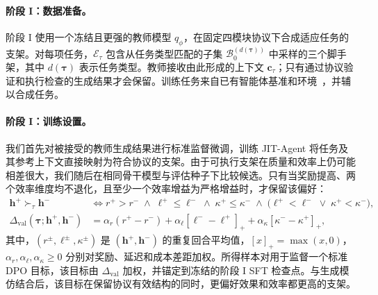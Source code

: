 \documentclass{article}
\newcommand{\ourmethod}{JIT-Agent\xspace}
\begin{document}
\vspace{-0.5em}
\paragraph{阶段 I：数据准备。}\label{sec:scaffold_synthesis}
阶段 I 使用一个冻结且更强的教师模型 $q_{\phi}$，在固定四模块协议下合成适应任务的支架。对每项任务，$\mathcal{E}_{\tau}$ 包含从任务类型匹配的子集 $\mathcal{B}_0^{(d(\boldsymbol{\tau}))}$ 中采样的三个脚手架，其中 $d(\boldsymbol{\tau})$ 表示任务类型。教师接收由此形成的上下文 $\mathbf{c}_{\tau}$；只有通过协议验证和执行检查的生成结果才会保留。训练任务来自已有智能体基准和环境~\citep{wu2025webwalkerbenchmarkingllmsweb,shi2025taskcraftautomatedgenerationagentic,bai2026clawgymscalableframeworkbuilding,song2026envscalerscalingtoolinteractiveenvironments}，并辅以合成任务。

\vspace{-0.5em}
\paragraph{阶段 I：训练设置。}
我们首先对被接受的教师生成结果进行标准监督微调，训练 \ourmethod 将任务及其参考上下文直接映射为符合协议的支架。由于可执行支架在质量和效率上仍可能相差很大，我们随后在相同骨干模型与评估种子下比较候选。只有当奖励提高、两个效率维度均不退化，且至少一个效率增益为严格增益时，才保留该偏好：
\begin{equation}
\label{eq:stage1_value_gap}
\begin{aligned}
\mathbf{h}^{+} \succ_{\tau} \mathbf{h}^{-}
&\iff
r^{+} > r^{-}
\;\land\;
\ell^{+}\leq\ell^{-}
\;\land\;
\kappa^{+}\leq\kappa^{-}
\;\land\;
\bigl(\ell^{+}<\ell^{-}\;\lor\;\kappa^{+}<\kappa^{-}\bigr), \\
\Delta_{\mathrm{val}}(\boldsymbol{\tau};\mathbf{h}^{+},\mathbf{h}^{-})
&= \alpha_r (r^{+} - r^{-})
+ \alpha_{\ell}[\ell^{-}-\ell^{+}]_{+}
+ \alpha_{\kappa}[\kappa^{-}-\kappa^{+}]_{+},
\end{aligned}
\end{equation}
其中，$(r^{\pm},\ell^{\pm},\kappa^{\pm})$ 是 $(\mathbf{h}^{+},\mathbf{h}^{-})$ 的重复回合平均值，$[x]_{+}=\max(x,0)$，$\alpha_r,\alpha_{\ell},\alpha_{\kappa}\geq0$ 分别对奖励、延迟和成本差距加权。所得样本对用于监督一个标准 DPO 目标，该目标由 $\Delta_{\mathrm{val}}$ 加权，并锚定到冻结的阶段 I SFT 检查点。与生成模仿结合后，该目标在保留协议有效结构的同时，更偏好效果和效率都更高的支架。


\vspace{-0.5em}
\end{document}
